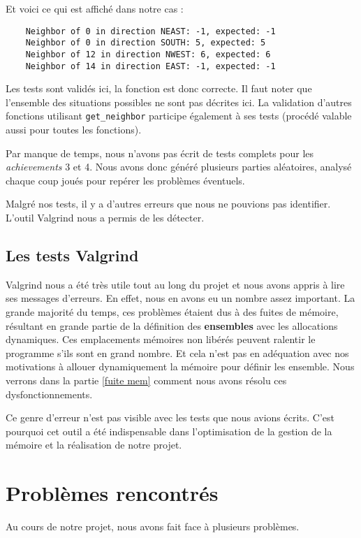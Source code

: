 \documentclass[a4paper]{article}
\begin{document}
Et voici ce qui est affiché dans notre cas :

\begin{verbatim}
    Neighbor of 0 in direction NEAST: -1, expected: -1
    Neighbor of 0 in direction SOUTH: 5, expected: 5
    Neighbor of 12 in direction NWEST: 6, expected: 6
    Neighbor of 14 in direction EAST: -1, expected: -1
\end{verbatim}

Les tests sont validés ici, la fonction est donc correcte. Il faut noter que l'ensemble des situations possibles ne sont pas décrites ici. La validation d'autres fonctions utilisant \verb|get_neighbor| participe également à ses tests (procédé valable aussi pour toutes les fonctions).

Par manque de temps, nous n'avons pas écrit de tests complets pour les \emph{achievements} 3 et 4. Nous avons donc généré plusieurs parties aléatoires, analysé chaque coup joués pour repérer les problèmes éventuels.

\vspace{0.5cm}

Malgré nos tests, il y a d'autres erreurs que nous ne pouvions pas identifier. L'outil Valgrind nous a permis de les détecter.

\subsection{Les tests Valgrind}
\label{valgrind tests}

Valgrind nous a été très utile tout au long du projet et nous avons appris à lire ses messages d'erreurs. En effet, nous en avons eu un nombre assez important. La grande majorité du temps, ces problèmes étaient dus à des fuites  de mémoire, résultant en grande partie de la définition des \textbf{ensembles} avec les allocations dynamiques. Ces emplacements mémoires non libérés peuvent ralentir le programme s'ils sont en grand nombre. Et cela n'est pas en adéquation avec nos motivations à allouer dynamiquement la mémoire pour définir les ensemble. Nous verrons dans la partie \ref{fuite mem} comment nous avons résolu ces dysfonctionnements.

Ce genre d'erreur n'est pas visible avec les tests que nous avions écrits. C'est pourquoi cet outil a été indispensable dans l'optimisation de la gestion de la mémoire et la réalisation de notre projet.

\section{Problèmes rencontrés}
\label{pb}
Au cours de notre projet, nous avons fait face à plusieurs problèmes.
\end{document}

